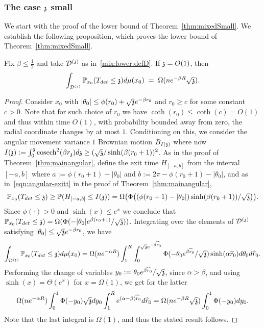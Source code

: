\subsubsection{The case $\ss$ small}
We start with the proof of the lower bound of Theorem~\ref{thm:mixedSmall}. 
We establish the following proposition, which proves the  lower bound of Theorem~\ref{thm:mixedSmall}. %
\begin{proposition}\label{generalschico_lower}
 Fix $\beta\le\frac{1}{2}$ and take $\dt$ as in~\eqref{mix:lower:defD}. If $\ss=O(1)$, then
\[\int_{\dt}\P_{x_0}(T_{det}\leq \ss)d\mu(x_0) 
\;=\; \Omega(ne^{-\beta R}\sqrt{\ss}).\]
\end{proposition}
\begin{proof}
Consider $x_0$ with $|\theta_0| \le \phi(r_0)+\sqrt{\ss} e^{-\beta r_0}$ and $r_0 \ge c$ for some constant $c > 0$. Note that for such choice of $r_0$ we have $\coth(r_0)\leq\coth(c)=O(1)$ and thus within time $O(1)$, with probability bounded away from zero, the radial coordinate changes by at most $1$. Conditioning on this, we consider the angular movement variance $1$ Brownian motion $B_{\II{\ss}}$ where now $\II{\ss}:=\int_0^\ss\cosech^2(\beta r_{\ss})d\ss\geq (\sqrt{\ss}/\sinh(\beta(r_0+1))^2$. As in the proof of Theorem~\ref{thm:mainangular}, define the exit time $H_{[-a,b]}$ from the interval $[-a,b]$ where
 $a:=\phi(r_0+1)-|\theta_0|$ and $b:=2\pi-\phi(r_0+1)-|\theta_0|$, and as in~\eqref{eqn:angular-exitt} in the proof of Theorem~\ref{thm:mainangular},
$$
\mathbb{P}_{x_0}(T_{det} \le \ss) \ge \mathbb{P}(H_{[-a,b]} \le \II{\ss})=\Omega\big(\Phi\big((\phi(r_0+1)-|\theta_0|)\sinh(\beta (r_0+1))/\sqrt{\ss}\big)\big).
$$
Since $\phi(\cdot)>0$ and $\sinh(x)\leq e^{x}$ we conclude that $\PP_{x_0}(T_{det}\le \ss)
  =\Omega(\Phi(-|\theta_0|e^{\beta (r_0+1)}/\sqrt{\ss}))$.
Integrating over the elements of $\dt$ satisfying $|\theta_0| \le \sqrt{\ss} e^{-\beta r_0}$, 
we have
$$
\int_{\dt} \mathbb{P}_{x_0}(T_{det} \le \ss) d\mu(x_0) =
\Omega(ne^{-\alpha R})\int_{1}^R \int_0^{\sqrt{\ss} e^{-\beta \widehat{r}_0}} 
\Phi(-\theta_0 e^{\beta \widehat{r}_0}/\sqrt{\ss})\sinh(\alpha \widehat{r}_0) d\theta_0 d\widehat{r}_0. 
$$
Performing the change of variables $y_0:=\theta_0 e^{\beta \widehat{r}_0}/\sqrt{\ss}$, since $\alpha>\beta$, and using $\sinh(x)=\Theta(e^x)$ for $x=\Omega(1)$, we get for the latter
$$
\Omega(ne^{-\alpha R})\int_0^{1} \Phi(-y_0)\sqrt{\ss}dy_0\int_{1}^R e^{(\alpha-\beta)\widehat{r}_0} d\widehat{r}_0=\Omega(ne^{-\beta R}\sqrt{\ss})\int_0^{1} \Phi(-y_0) dy_0.
$$
Note that the last integral is $\Omega(1)$, and thus the stated result follows.
\end{proof}


